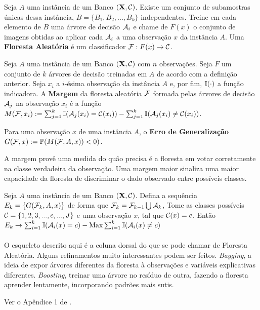  \begin{defi}
 Seja $A$ uma instância de um Banco $(\mathbf{X}, \mathcal{C})$. Existe um conjunto de subamostras únicas dessa instância, $B = \{ B_1, B_2, ..., B_k\}$  independentes. Treine em cada elemento de $B$ uma árvore de decisão $\mathcal{A}_i$ e chame de $F(x)$ o conjunto de imagens obtidas ao aplicar cada $\mathcal{A}_i$ a uma observação $x$ da instância $A$. Uma \textbf{Floresta Aleatória} é um classificador $\mathcal{F} : F(x) \to \mathcal{C}$. 
  \end{defi}
  
  \begin{defi}
  Seja $A$ uma instância de um Banco $(\mathbf{X}, \mathcal{C})$ com $n$ observações. Seja $F$ um conjunto de $k$ árvores de decisão treinadas em $A$ de acordo com a definição anterior. Seja $x_i$ a $i$-ésima observação da instância $A$ e, por fim, $\mathbb{I}(\cdot)$ a função indicadora. A \textbf{Margem} da floresta aleatória $\mathcal{F}$ formada pelas árvores de decisão $\mathcal{A}_j$ na observação $x_i$ é a função $M(\mathcal{F}, x_i) := \sum_{j=1}^k \mathbb{I} ( \mathcal{A}_j (x_i) = \mathcal{C}(x_i) ) - \sum_{j=1}^k \mathbb{I}  ( \mathcal{A}_j (x_i) \neq \mathcal{C}(x_i) )$.
  \end{defi}
  
 
  \begin{defi}
 Para uma observação $x$ de uma instância $A$, o \textbf{Erro de Generalização} $G(\mathcal{F}, x) := \mathbb{P} (M(\mathcal{F}, A, x)) < 0)$.  \end{defi}
  
  A margem provê uma medida do quão precisa é a floresta em votar corretamente na classe verdadeira da observação. Uma margem maior sinaliza uma maior capacidade da floresta de discriminar o dado observado entre possíveis classes.  

 \begin{teo} Seja $A$ uma instância de um Banco $(\mathbf{X}, \mathcal{C})$. Defina a sequência $E_k = \{ G(\mathcal{F}_k, A, x) \}$ de forma que $\mathcal{F}_k = \mathcal{F}_{k-1} \bigcup \mathcal{A}_k $,  Tome as classes possíveis $\mathcal{C} = \{1,2,3,...,c,...,J \}$ e uma observação $x$, tal que $\mathcal{C}(x) = c$. Então $E_k \to \sum_{i=1}^k \mathbb{I} ( \mathcal{A}_i (x) = c ) - \underset{}{\text{Max}} \sum_{i=1}^k \mathbb{I}  ( \mathcal{A}_i (x) \neq c) $
 
 \end{teo}
 
 O esqueleto descrito aqui é a coluna dorsal do que se pode chamar de Floresta Aleatória. Alguns refinamentos muito interessantes podem ser feitos. \textit{Bagging}, a ideia de expor árvores diferentes da floresta à observações e variáveis explicativas diferentes. \textit{Boosting}, treinar uma árvore no resíduo de outra, fazendo a floresta aprender lentamente, incorporando padrões mais sutis. 
 
 
 
 \begin{prova}
 Ver o Apêndice 1 de . \blacksquare
 \end{prova}
